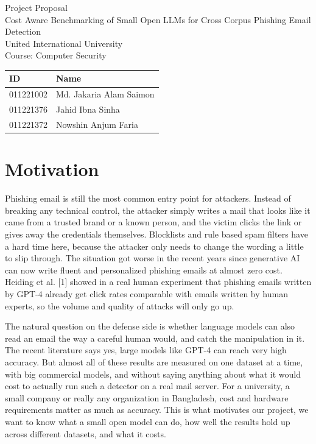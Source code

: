 \documentclass[11pt,a4paper]{article}
\begin{document}
\begin{center}
{\Large Project Proposal}\\[6pt]
{\large Cost Aware Benchmarking of Small Open LLMs for Cross Corpus Phishing Email Detection}\\[10pt]
United International University\\[2pt]
Course: Computer Security\\[10pt]
\begin{tabular}{ll}
\textbf{ID} & \textbf{Name}\\
\hline
011221002 & Md. Jakaria Alam Saimon\\
011221376 & Jahid Ibna Sinha\\
011221372 & Nowshin Anjum Faria\\
\end{tabular}
\end{center}

\vspace{8pt}

\section{Motivation}

Phishing email is still the most common entry point for attackers. Instead of breaking any technical control, the attacker simply writes a mail that looks like it came from a trusted brand or a known person, and the victim clicks the link or gives away the credentials themselves. Blocklists and rule based spam filters have a hard time here, because the attacker only needs to change the wording a little to slip through. The situation got worse in the recent years since generative AI can now write fluent and personalized phishing emails at almost zero cost. Heiding et al. [1] showed in a real human experiment that phishing emails written by GPT-4 already get click rates comparable with emails written by human experts, so the volume and quality of attacks will only go up.

The natural question on the defense side is whether language models can also read an email the way a careful human would, and catch the manipulation in it. The recent literature says yes, large models like GPT-4 can reach very high accuracy. But almost all of these results are measured on one dataset at a time, with big commercial models, and without saying anything about what it would cost to actually run such a detector on a real mail server. For a university, a small company or really any organization in Bangladesh, cost and hardware requirements matter as much as accuracy. This is what motivates our project, we want to know what a small open model can do, how well the results hold up across different datasets, and what it costs.
\end{document}
